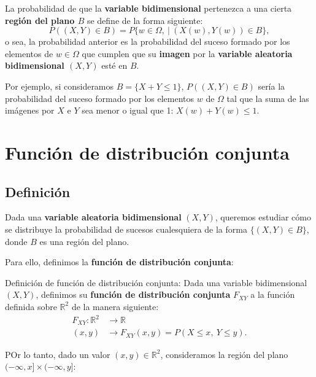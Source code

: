 \documentclass[]{book}
\begin{document}
La probabilidad de que la \textbf{variable bidimensional} pertenezca a una cierta \textbf{región del plano \(B\)} se define de la forma siguiente:
\[
P((X,Y)\in B)=P\{w\in \Omega,\ |\ (X(w),Y(w))\in B\},
\]
o sea, la probabilidad anterior es la probabilidad del suceso formado por los elementos de \(w\in\Omega\) que cumplen que su \textbf{imagen} por la \textbf{variable aleatoria bidimensional \((X,Y)\)} esté en \(B\).

Por ejemplo, si consideramos \(B=\{X+Y\leq 1\}\), \(P((X,Y)\in B)\) sería la probabilidad del suceso formado por los elementos \(w\) de \(\Omega\) tal que la suma de las imágenes por \(X\) e \(Y\) sea menor o igual que 1: \(X(w)+Y(w)\leq 1\).

\hypertarget{funciuxf3n-de-distribuciuxf3n-conjunta}{%
\section{Función de distribución conjunta}\label{funciuxf3n-de-distribuciuxf3n-conjunta}}

\hypertarget{definiciuxf3n-3}{%
\subsection{Definición}\label{definiciuxf3n-3}}

Dada una \textbf{variable aleatoria bidimensional} \((X,Y)\), queremos estudiar cómo se distribuye la probabilidad de sucesos cualesquiera de la forma \(\{(X,Y)\in B\}\), donde \(B\) es una región del plano.

Para ello, definimos la \textbf{función de distribución conjunta}:

Definición de función de distribución conjunta:
Dada una variable bidimensional \((X,Y)\), definimos su \textbf{función de distribución conjunta} \(F_{XY}\) a la función definida sobre \(\mathbb{R}^2\) de la manera siguiente:
\[
\begin{array}{rl}
F_{XY}: \mathbb{R}^2 & \longrightarrow \mathbb{R}\\
(x,y) & \longrightarrow F_{XY}(x,y)=P(X\leq x,\ Y\leq y).
\end{array}
\]

POr lo tanto, dado un valor \((x,y)\in \mathbb{R}^2\), consideramos la región del plano \((-\infty,x]\times (-\infty,y]\):
\end{document}
